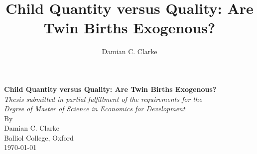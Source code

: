 \documentclass{article}[11pt,subeqn]
\title{Child Quantity versus Quality: Are Twin Births Exogenous?}
\author{Damian C. Clarke}
\begin{document}
\linenumbers
\begin{spacing}{1.25}


\begin{titlepage}
\begin{center} 
\textbf{\Large Child Quantity versus Quality: Are Twin Births Exogenous?}\\
\vspace{3cm}
\emph{Thesis submitted in partial fulfillment of the requirements for the\\
Degree of Master of Science in Economics for Development}\\ 
\vspace{0.2cm}
\vspace{3.5cm}
By\\
\vspace{2.5cm}
Damian C. Clarke\\
Balliol College, Oxford\\
\today\\
\vspace{5cm}
\end{center}
\end{titlepage}


\end{spacing}
\end{document}
